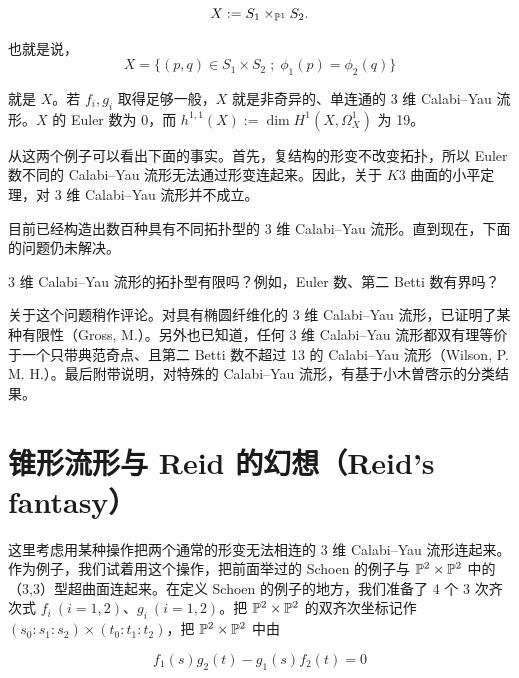 \[
  X := S_1 \times_{\mathbb{P}^1} S_2 .
\]

也就是说，
\[
  X = \{(p,q) \in S_1\times S_2 \;;\; \phi_1(p) = \phi_2(q)\}
\]

就是 $X$。若 $f_i, g_i$ 取得足够一般，$X$ 就是非奇异的、单连通的 3 维 Calabi--Yau 流形。$X$ 的 Euler 数为 0，而 $h^{1,1}(X) := \dim H^1(X,\Omega^1_X)$ 为 19。


从这两个例子可以看出下面的事实。首先，复结构的形变不改变拓扑，所以 Euler 数不同的 Calabi--Yau 流形无法通过形变连起来。因此，关于 $K3$ 曲面的小平定理，对 3 维 Calabi--Yau 流形并不成立。


目前已经构造出数百种具有不同拓扑型的 3 维 Calabi--Yau 流形。直到现在，下面的问题仍未解决。

\begin{problem}{}
  3 维 Calabi--Yau 流形的拓扑型有限吗？例如，Euler 数、第二 Betti 数有界吗？
\end{problem}

关于这个问题稍作评论。对具有椭圆纤维化的 3 维 Calabi--Yau 流形，已证明了某种有限性（Gross, M.）。另外也已知道，任何 3 维 Calabi--Yau 流形都双有理等价于一个只带典范奇点、且第二 Betti 数不超过 13 的 Calabi--Yau 流形（Wilson, P. M. H.）。最后附带说明，对特殊的 Calabi--Yau 流形，有基于小木曽啓示的分类结果。

\section{锥形流形与 Reid 的幻想（Reid's fantasy）}

这里考虑用某种操作把两个通常的形变无法相连的 3 维 Calabi--Yau 流形连起来。作为例子，我们试着用这个操作，把前面举过的 Schoen 的例子与 $\mathbb{P}^2\times\mathbb{P}^2$ 中的（3,3）型超曲面连起来。在定义 Schoen 的例子的地方，我们准备了 4 个 3 次齐次式 $f_i\ (i=1,2)$、$g_i\ (i=1,2)$。把 $\mathbb{P}^2\times\mathbb{P}^2$ 的双齐次坐标记作 $(s_0:s_1:s_2)\times(t_0:t_1:t_2)$，把 $\mathbb{P}^2\times\mathbb{P}^2$ 中由

\[
  f_1(s)g_2(t) - g_1(s)f_2(t) = 0
\]

